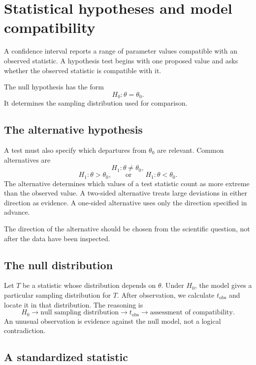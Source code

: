 \section{Statistical hypotheses and model compatibility}

A confidence interval reports a range of parameter values compatible with an
observed statistic. A hypothesis test begins with one proposed value and asks
whether the observed statistic is compatible with it.

The null hypothesis has the form
\[
H_0:\theta=\theta_0.
\]
It determines the sampling distribution used for comparison.

\subsection*{The alternative hypothesis}

A test must also specify which departures from \(\theta_0\) are relevant. Common
alternatives are
\[
H_1:\theta\neq\theta_0,
\]
\[
H_1:\theta>\theta_0,
\qquad\text{or}\qquad
H_1:\theta<\theta_0.
\]
The alternative determines which values of a test statistic count as more
extreme than the observed value. A two-sided alternative treats large deviations
in either direction as evidence. A one-sided alternative uses only the direction
specified in advance.

\begin{remarkbox}
The direction of the alternative should be chosen from the scientific question,
not after the data have been inspected.
\end{remarkbox}

\subsection*{The null distribution}

Let \(T\) be a statistic whose distribution depends on \(\theta\). Under
\(H_0\), the model gives a particular sampling distribution for \(T\). After
observation, we calculate \(t_{\mathrm{obs}}\) and locate it in that distribution.
The reasoning is
\[
H_0
\longrightarrow
\text{null sampling distribution}
\longrightarrow
 t_{\mathrm{obs}}
\longrightarrow
\text{assessment of compatibility}.
\]
An unusual observation is evidence against the null model, not a logical
contradiction.

\subsection*{A standardized statistic}

